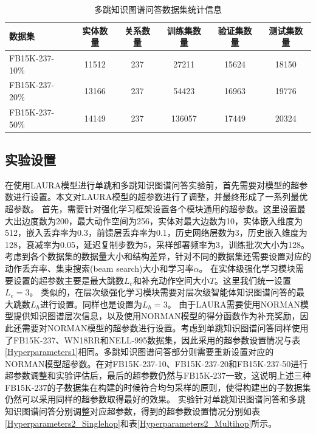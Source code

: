 \documentclass[algorithmlist, AutoFakeBold, AutoFakeSlant, figurelist, tablelist, nomlist, engineering]{seuthesix}
\begin{document}
\begin{table}
  \centering
  \begin{tabular*}{0.95\textwidth}{@{\extracolsep{\fill}}lccccc}
		\toprule[1pt]
    数据集 & 实体数量 & 关系数量 & 训练集数量 & 验证集数量 & 测试集数量 \\ \hline
    FB15K-237-10\% & 11512 & 237 & 27211 & 15624 & 18150\\
    FB15K-237-20\% & 13166 & 237 & 54423 & 16963 & 19776\\
    FB15K-237-50\% & 14149 & 237 & 136057 & 17449 & 20324\\
		\bottomrule[1pt]
	\end{tabular*}
  \caption{多跳知识图谱问答数据集统计信息}
  \label{Datasets2}
\end{table}

\subsection{实验设置}
在使用LAURA模型进行单跳和多跳知识图谱问答实验前，首先需要对模型的超参数进行设置。本文对LAURA模型的超参数进行了调整，并最终形成了一系列最优超参数。
首先，需要针对强化学习框架设置各个模块通用的超参数。这里设置最大出边度数为200，最大动作空间为256，实体对最大边数为10，实体嵌入维度为512，嵌入丢弃率为0.3，前馈层丢弃率为0.1，历史网络层数为3，历史嵌入维度为128，衰减率为0.05，延迟复制步数为5，采样部署频率为3，训练批次大小为128。
考虑到各个数据集的数据量大小和结构差异，针对不同的数据集还需要设置对应的动作丢弃率、集束搜索(beam search)大小和学习率$\alpha$。
在实体级强化学习模块需要设置的超参数主要是最大跳数$L_e$和补充动作空间大小$T$。这里我们统一设置$L_e = 3$。
类似的，在层次级强化学习模块需要对层次级智能体知识图谱问答的最大跳数$L_h$进行设置。同样也是设置为$L_h = 3$。
由于LAURA需要使用NORMAN模型提供知识图谱层次信息，以及使用NORMAN模型的得分函数作为补充奖励，因此还需要对NORMAN模型的超参数进行设置。考虑到单跳知识图谱问答同样使用了FB15K-237、WN18RR和NELL-995数据集，因此采用的超参数设置情况与表\ref{Hyperparameters1}相同。多跳知识图谱问答部分则需要重新设置对应的NORMAN模型超参数。在对FB15K-237-10、FB15K-237-20和FB15K-237-50进行超参数调整和实验评估后，最后的超参数仍然与FB15K-237一致，这说明上述三种FB15K-237的子数据集在构建的时候符合均匀采样的原则，使得构建出的子数据集仍然可以采用同样的超参数取得最好的效果。
实验针对单跳知识图谱问答和多跳知识图谱问答分别调整对应超参数，得到的超参数设置情况分别如表\ref{Hyperparameters2_Singlehop}和表\ref{Hyperparameters2_Multihop}所示。
\end{document}
